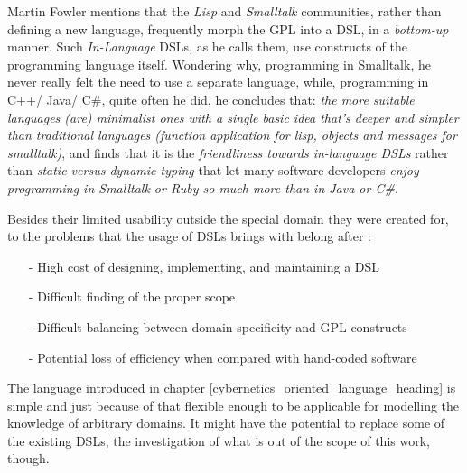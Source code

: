 Martin Fowler \cite{fowlerdsl} mentions that the \emph{Lisp} \cite{commonlisp}
and \emph{Smalltalk} \cite{smalltalk} communities, rather than defining a new
language, frequently morph the GPL into a DSL, in a \emph{bottom-up} manner.
Such \emph{In-Language} DSLs, as he calls them, use constructs of the
programming language itself. Wondering why, programming in Smalltalk, he never
really felt the need to use a separate language, while, programming in C++/
Java/ C\#, quite often he did, he concludes \cite{fowlerdsl} that: \textit{the
more suitable languages (are) minimalist ones with a single basic idea that's
deeper and simpler than traditional languages (function application for lisp,
objects and messages for smalltalk)}, and finds that it is the
\textit{friendliness towards in-language DSLs} rather than \textit{static
versus dynamic typing} that let many software developers \textit{enjoy
programming in Smalltalk or Ruby so much more than in Java or C\#}.

Besides their limited usability outside the special domain they were created
for, to the problems that the usage of DSLs brings with belong after
\cite{menzies}:

\begin{itemize}
    \item[-] High cost of designing, implementing, and maintaining a DSL
    \item[-] Difficult finding of the proper scope
    \item[-] Difficult balancing between domain-specificity and GPL constructs
    \item[-] Potential loss of efficiency when compared with hand-coded software
\end{itemize}

The language introduced in chapter \ref{cybernetics_oriented_language_heading}
is simple and just because of that flexible enough to be applicable for
modelling the knowledge of arbitrary domains. It might have the potential to
replace some of the existing DSLs, the investigation of what is out of the
scope of this work, though.

